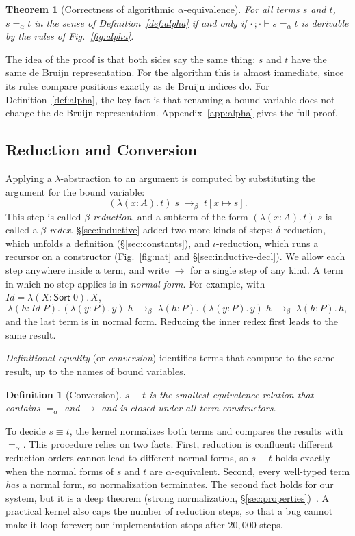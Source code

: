 \documentclass[acmsmall,screen,nonacm]{acmart}
\newtheorem{definition}{Definition}
\newtheorem{theorem}{Theorem}
\newcommand{\Sort}[1]{\mathsf{Sort}\;#1}
\newcommand{\tLam}[3]{\lambda(#1{:}#2).\,#3}
\newcommand{\subst}[3]{#1[#2 \mapsto #3]}
\newcommand{\alphaeq}{=_{\alpha}}
\newcommand{\betared}{\to_{\beta}}
\newcommand{\conv}{\equiv}
\begin{document}
\begin{theorem}[Correctness of algorithmic $\alpha$-equivalence]
\label{thm:alpha}
For all terms $s$ and $t$, $s \alphaeq t$ in the sense of Definition~\ref{def:alpha} if and only if $\cdot\,;\cdot \vdash s \alphaeq t$ is derivable by the rules of Fig.~\ref{fig:alpha}.
\end{theorem}

\noindent The idea of the proof is that both sides say the same thing: $s$ and $t$ have the same de Bruijn representation.
For the algorithm this is almost immediate, since its rules compare positions exactly as de Bruijn indices do.
For Definition~\ref{def:alpha}, the key fact is that renaming a bound variable does not change the de Bruijn representation.
Appendix~\ref{app:alpha} gives the full proof.

\subsection{Reduction and Conversion}
\label{sec:conversion}

Applying a $\lambda$-abstraction to an argument is computed by substituting the argument for the bound variable:
\[
(\tLam{x}{A}{t})\;s \;\betared\; \subst{t}{x}{s}.
\]
This step is called \emph{$\beta$-reduction}, and a subterm of the form $(\tLam{x}{A}{t})\;s$ is called a \emph{$\beta$-redex}.
\S\ref{sec:inductive} added two more kinds of steps: $\delta$-reduction, which unfolds a definition (\S\ref{sec:constants}),
and $\iota$-reduction, which runs a recursor on a constructor (Fig.~\ref{fig:nat} and \S\ref{sec:inductive-decl}).
We allow each step anywhere inside a term, and write $\to$ for a single step of any kind.
A term in which no step applies is in \emph{normal form}.
For example, with $\mathit{Id} = \tLam{X}{\Sort{0}}{X}$,
\[
\tLam{h}{\mathit{Id}\;P}{(\tLam{y}{P}{y})\;h} \;\betared\; \tLam{h}{P}{(\tLam{y}{P}{y})\;h} \;\betared\; \tLam{h}{P}{h},
\]
and the last term is in normal form.
Reducing the inner redex first leads to the same result.

\emph{Definitional equality} (or \emph{conversion}) identifies terms that compute to the same result, up to the names of bound variables.

\begin{definition}[Conversion]
$s \conv t$ is the smallest equivalence relation that contains $\alphaeq$ and $\to$ and is closed under all term constructors.
\end{definition}

To decide $s \conv t$, the kernel normalizes both terms and compares the results with $\alphaeq$.
This procedure relies on two facts.
First, reduction is confluent: different reduction orders cannot lead to different normal forms, so $s \conv t$ holds exactly when the normal forms of $s$ and $t$ are $\alpha$-equivalent.
Second, every well-typed term \emph{has} a normal form, so normalization terminates.
The second fact holds for our system, but it is a deep theorem (strong normalization, \S\ref{sec:properties})~\cite{barendregt1992lambda}.
A practical kernel also caps the number of reduction steps, so that a bug cannot make it loop forever; our implementation stops after $20{,}000$ steps.
\end{document}
